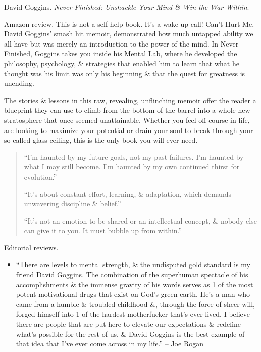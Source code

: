 \documentclass{article}
\begin{document}
\begin{enumerate}
	\item {\sc David Goggins}. {\it Never Finished: Unshackle Your Mind \& Win the War Within}. {}

	{\sf Amazon review.} This is not a self-help book. It's a wake-up call! Can't Hurt Me, {\sc David Goggins}' smash hit memoir, demonstrated how much untapped ability we all have but was merely an introduction to the power of the mind. In Never Finished, {\sc Goggins} takes you inside his Mental Lab, where he developed the philosophy, psychology, \& strategies that enabled him to learn that what he thought was his limit was only his beginning \& that the quest for greatness is unending.

	The stories \& lessons in this raw, revealing, unflinching memoir offer the reader a blueprint they can use to climb from the bottom of the barrel into a whole new stratosphere that once seemed unattainable. Whether you feel off-course in life, are looking to maximize your potential or drain your soul to break through your so-called glass ceiling, this is the only book you will ever need.
	\begin{quote}
		\item ``I'm haunted by my future goals, not my past failures. I'm haunted by what I may still become. I'm haunted by my own continued thirst for evolution.''
		\item ``It's about constant effort, learning, \& adaptation, which demands unwavering discipline \& belief.''
		\item ``It's not an emotion to be shared or an intellectual concept, \& nobody else can give it to you. It must bubble up from within.''
	\end{quote}
	{\sf Editorial reviews.}
	\begin{itemize}
		\item ``There are levels to mental strength, \& the undisputed gold standard is my friend {\sc David Goggins}. The combination of the superhuman spectacle of his accomplishments \& the immense gravity of his words serves as 1 of the most potent motivational drugs that exist on God's green earth. He's a man who came from a humble \& troubled childhood \&, through the force of sheer will, forged himself into 1 of the hardest motherfucker that's ever lived. I believe there are people that are put here to elevate our expectations \& redefine what's possible for the rest of us, \& {\sc David Goggins} is the best example of that idea that I've ever come across in my life.'' -- {\sc Joe Rogan}

\end{itemize}
\end{enumerate}
\end{document}
